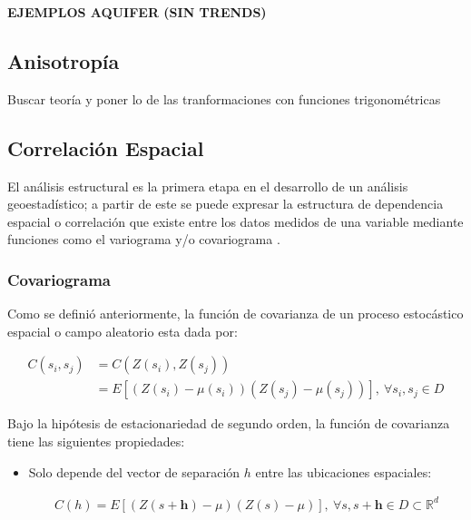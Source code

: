 \documentclass[
]{book}
\begin{document}
\textbf{EJEMPLOS AQUIFER (SIN TRENDS)}

\hypertarget{anisotropuxeda}{%
\subsection{Anisotropía}\label{anisotropuxeda}}

Buscar teoría y poner lo de las tranformaciones con funciones trigonométricas

\hypertarget{correlaciuxf3n-espacial}{%
\subsection{Correlación Espacial}\label{correlaciuxf3n-espacial}}

El análisis estructural es la primera etapa en el desarrollo de un análisis geoestadístico; a partir de este se puede expresar la estructura de dependencia espacial o correlación que existe entre los datos medidos de una variable mediante funciones como el variograma y/o covariograma \citep{Ramon}.

\hypertarget{covariograma}{%
\subsubsection*{Covariograma}\label{covariograma}}

Como se definió anteriormente, la función de covarianza de un proceso estocástico espacial o campo aleatorio esta dada por:

\begin{align*}
    C(s_i,s_j)&=C(Z(s_i),Z(s_j))\\
    &= E[(Z(s_i)-\mu(s_i)) (Z(s_j)-\mu(s_j))],\ \forall s_i,s_j\in D
\end{align*}

Bajo la hipótesis de estacionariedad de segundo orden, la función de covarianza tiene las siguientes propiedades:

\begin{itemize}
\item
  Solo depende del vector de separación \(h\) entre las ubicaciones espaciales:

  \begin{align*}
      C(h)=E[(Z(s+\textbf{h})-\mu)(Z(s)-\mu)],\ \forall s,s+\textbf{h} \in D\subset \mathbb{R}^d  
    \end{align*}
\end{itemize}
\end{document}
